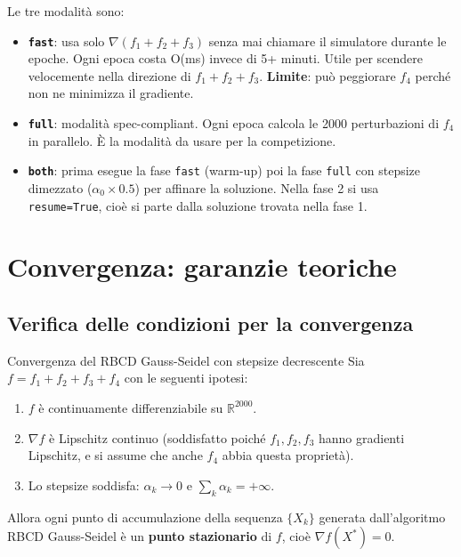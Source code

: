 \documentclass[12pt,a4paper]{article}
\theoremstyle{definition}
\newcommand{\R}{\mathbb{R}}
\newcommand{\grad}{\nabla}
\begin{document}
Le tre modalità sono:

\begin{itemize}
  \item \textbf{\texttt{fast}}: usa solo $\grad(f_1 + f_2 + f_3)$ senza mai chiamare il
        simulatore durante le epoche. Ogni epoca costa O(ms) invece di 5+ minuti.
        Utile per scendere velocemente nella direzione di $f_1 + f_2 + f_3$.
        \textbf{Limite}: può peggiorare $f_4$ perché non ne minimizza il gradiente.
  \item \textbf{\texttt{full}}: modalità spec-compliant. Ogni epoca calcola le 2000 perturbazioni
        di $f_4$ in parallelo. È la modalità da usare per la competizione.
  \item \textbf{\texttt{both}}: prima esegue la fase \texttt{fast} (warm-up) poi la fase
        \texttt{full} con stepsize dimezzato ($\alpha_0 \times 0.5$) per affinare la soluzione.
        Nella fase 2 si usa \texttt{resume=True}, cioè si parte dalla soluzione trovata nella fase 1.
\end{itemize}

\section{Convergenza: garanzie teoriche}

\subsection{Verifica delle condizioni per la convergenza}

\begin{thmbox}{Convergenza del RBCD Gauss-Seidel con stepsize decrescente}
Sia $f = f_1 + f_2 + f_3 + f_4$ con le seguenti ipotesi:
\begin{enumerate}
  \item $f$ è continuamente differenziabile su $\R^{2000}$.
  \item $\grad f$ è Lipschitz continuo (soddisfatto poiché $f_1, f_2, f_3$ hanno gradienti
        Lipschitz, e si assume che anche $f_4$ abbia questa proprietà).
  \item Lo stepsize soddisfa: $\alpha_k \to 0$ e $\sum_k \alpha_k = +\infty$.
\end{enumerate}
Allora ogni punto di accumulazione della sequenza $\{X_k\}$ generata dall'algoritmo RBCD
Gauss-Seidel è un \textbf{punto stazionario} di $f$, cioè $\grad f(X^*) = 0$.
\end{thmbox}
\end{document}
